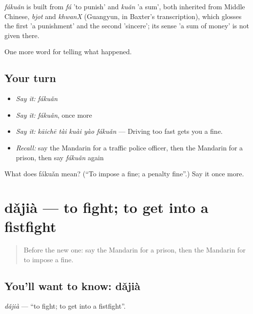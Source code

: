 \begin{cousinweb}
\emph{fákuǎn} is built from \emph{fá} 'to punish' and \emph{kuǎn} 'a sum', both inherited from Middle Chinese, \emph{bjot} and \emph{khwanX} (Guangyun, in Baxter's transcription), which glosses the first 'a punishment' and the second 'sincere'; its sense 'a sum of money' is not given there.
\end{cousinweb}

\begin{grammarlens}[title={What you've built}]
One more word for telling what happened.
\end{grammarlens}

\subsection*{Your turn}
\begin{itemize}
\raggedright
  \item \emph{Say it:} \emph{fákuǎn}
  \item \emph{Say it:} \emph{fákuǎn}, once more
  \item \emph{Say it:} \emph{kāichē tài kuài yào fákuǎn} — Driving too fast gets you a fine.
  \item \emph{Recall:} say the Mandarin for a traffic police officer, then the Mandarin for a prison, then say \emph{fákuǎn} again
\end{itemize}

\begin{tcolorbox}[breakable,colback=teal!4,colframe=teal!35!black,title={Before you move on}]
What does fákuǎn mean? (\textquotedblleft{}To impose a fine; a penalty fine\textquotedblright{}.) Say it once more.
\end{tcolorbox}
\section[dǎjià]{dǎjià — to fight; to get into a fistfight}

\label{lesson:ZH-C312-dajia}



\begin{quote}
Before the new one: say the Mandarin for a prison, then the Mandarin for to impose a fine.
\end{quote}

\subsection*{You'll want to know: dǎjià}
\emph{dǎjià} — \textquotedblleft{}to fight; to get into a fistfight\textquotedblright{}.

